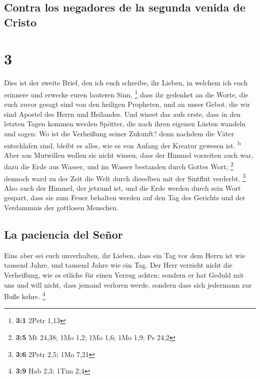 \hypertarget{contra-los-negadores-de-la-segunda-venida-de-cristo}{%
\subsection{Contra los negadores de la segunda venida de
Cristo}\label{contra-los-negadores-de-la-segunda-venida-de-cristo}}

\hypertarget{section-2}{%
\section{3}\label{section-2}}

 Dies ist der zweite Brief, den ich euch schreibe, ihr
Lieben, in welchem ich euch erinnere und erwecke euren lauteren Sinn,
\footnote{\textbf{3:1} 2Petr 1,13}  dass ihr gedenket an
die Worte, die euch zuvor gesagt sind von den heiligen Propheten, und an
unser Gebot, die wir sind Apostel des Herrn und Heilandes.
 Und wisset das aufs erste, dass in den letzten Tagen
kommen werden Spötter, die nach ihren eigenen Lüsten wandeln
 und sagen: Wo ist die Verheißung seiner Zukunft? denn
nachdem die Väter entschlafen sind, bleibt es alles, wie es von Anfang
der Kreatur gewesen ist. \textsuperscript{b}  Aber aus
Mutwillen wollen sie nicht wissen, dass der Himmel vorzeiten auch war,
dazu die Erde aus Wasser, und im Wasser bestanden durch Gottes Wort;
\footnote{\textbf{3:5} Mt 24,38; 1Mo 1,2; 1Mo 1,6; 1Mo 1,9; Ps 24,2}
 dennoch ward zu der Zeit die Welt durch dieselben mit der
Sintflut verderbt. \footnote{\textbf{3:6} 2Petr 2,5; 1Mo 7,21}
 Also auch der Himmel, der jetzund ist, und die Erde
werden durch sein Wort gespart, dass sie zum Feuer behalten werden auf
den Tag des Gerichts und der Verdammnis der gottlosen Menschen.

\hypertarget{la-paciencia-del-seuxf1or}{%
\subsection{La paciencia del Señor}\label{la-paciencia-del-seuxf1or}}

 Eins aber sei euch unverhalten, ihr Lieben, dass ein Tag
vor dem Herrn ist wie tausend Jahre, und tausend Jahre wie ein Tag.
 Der Herr verzieht nicht die Verheißung, wie es etliche
für einen Verzug achten; sondern er hat Geduld mit uns und will nicht,
dass jemand verloren werde, sondern dass sich jedermann zur Buße kehre.
\footnote{\textbf{3:9} Hab 2,3; 1Tim 2,4}

